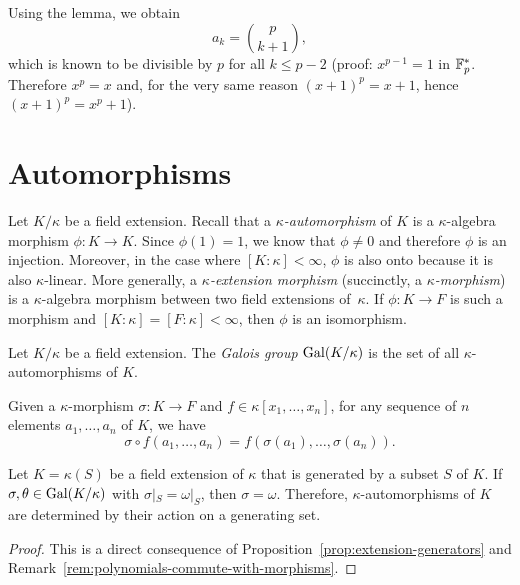 \begin{probl}
\begin{solution}
        Using the lemma, we obtain
        $$
            a_k = \binom p{k+1},
        $$
        which is known to be divisible by $p$ for all $k\le p-2$ (proof: $x^{p-1}=1$ in $\mathbb F_p^*$. Therefore $x^p=x$ and, for the very same reason $(x+1)^p=x+1$, hence $(x+1)^p=x^p+1$).
    \end{solution}
\end{probl}

\section{Automorphisms}

Let $K/\kappa$ be a field extension. Recall that a \textsl{$\kappa$-automorphism} of $K$ is a $\kappa$-algebra morphism $\phi\colon K\to K$. Since $\phi(1)=1$, we know that $\phi\ne0$ and therefore $\phi$ is an injection. Moreover, in the case where $[K:\kappa]<\infty$, $\phi$ is also onto because it is also $\kappa$-linear. More generally, a \textsl{$\kappa$-extension morphism} (succinctly, a \textsl{$\kappa$-morphism}) is a $\kappa$-algebra morphism between two field extensions of~$\kappa$. If $\phi\colon K\to F$ is such a morphism and $[K:\kappa]=[F:\kappa]<\infty$, then $\phi$ is an isomorphism.

\begin{defn}
    Let $K/\kappa$ be a field extension. The \textsl{Galois group\/} $\operatorname{Gal}(K/\kappa)$ is the set of all $\kappa$-automorphisms of $K$.
\end{defn}

\begin{rem}\label{rem:polynomials-commute-with-morphisms}
    Given a $\kappa$-morphism $\sigma\colon K\to F$ and $f\in\kappa[x_1,\dots,x_n]$, for any sequence of $n$ elements $a_1,\dots,a_n$ of $K$, we have
    $$
        \sigma\circ f(a_1,\dots,a_n)= f(\sigma(a_1),\dots,\sigma(a_n)).
    $$
\end{rem}

\begin{lem}\label{lem:automorphisms-and-generators}
    Let\/ $K = \kappa(S)$ be a field extension of\/ $\kappa$ that is generated by a subset\/ $S$ of\/ $K$. If\/ $\sigma, \theta\in\operatorname{Gal}(K/\kappa)$ with\/ $\sigma|_S=\omega|_S$, then\/ $\sigma=\omega$. Therefore, $\kappa$-automorphisms of\/ $K$ are determined by their action on a generating set.
\end{lem}

\begin{proof}
    This is a direct consequence of Proposition~\ref{prop:extension-generators} and Remark~\ref{rem:polynomials-commute-with-morphisms}.
\end{proof}


